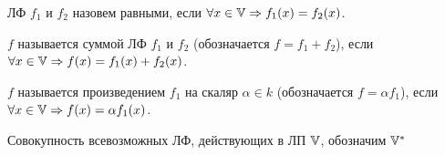 \documentclass[../main.tex]{subfiles}
\begin{document}
\begin{definition}
    ЛФ $f_{1}$ и $f_{2}$ назовем равными, если $\forall x\in \mathbb{V} \Rightarrow f_{1}(x) = f_{2}(x)$.
    
\end{definition}
\begin{definition}
    $f$ называется суммой ЛФ $f_{1}$ и $f_{2}$ (обозначается $f=f_{1}+f_{2}$), если $\forall x\in \mathbb{V} \Rightarrow f(x) = f_{1}(x)+f_{2}(x)$.
\end{definition}
\begin{definition}
    $f$ называется произведением $f_{1}$ на скаляр $\alpha \in k$ (обозначается $f=\alpha f_{1}$), если $\forall x\in \mathbb{V} \Rightarrow f(x) = \alpha f_{1}(x)$.
\end{definition}
\begin{definition}
    Совокупность всевозможных ЛФ, действующих в ЛП $\mathbb{V}$, обозначим $\mathbb{V}^{*}$
\end{definition}
\end{document}
